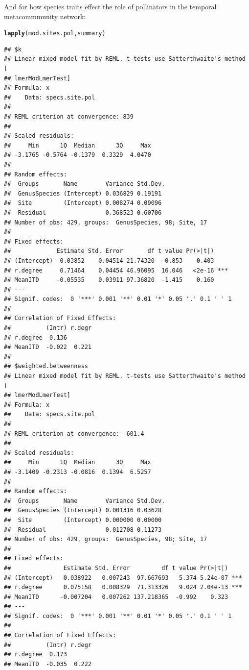\documentclass{article}\usepackage[]{graphicx}\usepackage[]{color}
\makeatletter
\newcommand{\hlstd}[1]{\textcolor[rgb]{0.345,0.345,0.345}{#1}}%
\newcommand{\hlkwd}[1]{\textcolor[rgb]{0.737,0.353,0.396}{\textbf{#1}}}%
\newenvironment{kframe}{%
 \def\at@end@of@kframe{}%
 \ifinner\ifhmode%
  \def\at@end@of@kframe{\end{minipage}}%
  \begin{minipage}{\columnwidth}%
 \fi\fi%
 \def\FrameCommand##1{\hskip\@totalleftmargin \hskip-\fboxsep
 \colorbox{shadecolor}{##1}\hskip-\fboxsep
     \hskip-\linewidth \hskip-\@totalleftmargin \hskip\columnwidth}%
 \MakeFramed {\advance\hsize-\width
   \@totalleftmargin\z@ \linewidth\hsize
   \@setminipage}}%
 {\par\unskip\endMakeFramed%
 \at@end@of@kframe}
\newenvironment{knitrout}{}{} %
\makeatother
\begin{document}
And for how species traits effect the role of pollinators in
the temporal metacommmunity network: 
\begin{knitrout}
\color{fgcolor}\begin{kframe}
\begin{alltt}
\hlkwd{lapply}\hlstd{(mod.sites.pol, summary)}
\end{alltt}
\begin{verbatim}
## $k
## Linear mixed model fit by REML. t-tests use Satterthwaite's method [
## lmerModLmerTest]
## Formula: x
##    Data: specs.site.pol
## 
## REML criterion at convergence: 839
## 
## Scaled residuals: 
##     Min      1Q  Median      3Q     Max 
## -3.1765 -0.5764 -0.1379  0.3329  4.0470 
## 
## Random effects:
##  Groups       Name        Variance Std.Dev.
##  GenusSpecies (Intercept) 0.036829 0.19191 
##  Site         (Intercept) 0.008274 0.09096 
##  Residual                 0.368523 0.60706 
## Number of obs: 429, groups:  GenusSpecies, 98; Site, 17
## 
## Fixed effects:
##             Estimate Std. Error       df t value Pr(>|t|)    
## (Intercept) -0.03852    0.04514 21.74320  -0.853    0.403    
## r.degree     0.71464    0.04454 46.96095  16.046   <2e-16 ***
## MeanITD     -0.05535    0.03911 97.36820  -1.415    0.160    
## ---
## Signif. codes:  0 '***' 0.001 '**' 0.01 '*' 0.05 '.' 0.1 ' ' 1
## 
## Correlation of Fixed Effects:
##          (Intr) r.degr
## r.degree  0.136       
## MeanITD  -0.022  0.221
## 
## $weighted.betweenness
## Linear mixed model fit by REML. t-tests use Satterthwaite's method [
## lmerModLmerTest]
## Formula: x
##    Data: specs.site.pol
## 
## REML criterion at convergence: -601.4
## 
## Scaled residuals: 
##     Min      1Q  Median      3Q     Max 
## -3.1409 -0.2313 -0.0816  0.1394  6.5257 
## 
## Random effects:
##  Groups       Name        Variance Std.Dev.
##  GenusSpecies (Intercept) 0.001316 0.03628 
##  Site         (Intercept) 0.000000 0.00000 
##  Residual                 0.012708 0.11273 
## Number of obs: 429, groups:  GenusSpecies, 98; Site, 17
## 
## Fixed effects:
##               Estimate Std. Error         df t value Pr(>|t|)    
## (Intercept)   0.038922   0.007243  97.667693   5.374 5.24e-07 ***
## r.degree      0.075158   0.008329  71.313326   9.024 2.04e-13 ***
## MeanITD      -0.007204   0.007262 137.218365  -0.992    0.323    
## ---
## Signif. codes:  0 '***' 0.001 '**' 0.01 '*' 0.05 '.' 0.1 ' ' 1
## 
## Correlation of Fixed Effects:
##          (Intr) r.degr
## r.degree  0.173       
## MeanITD  -0.035  0.222
\end{verbatim}
\end{kframe}
\end{knitrout}
\end{document}
